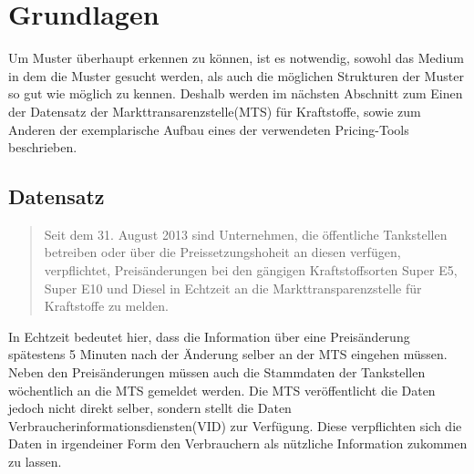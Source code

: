 \documentclass[12pt,a4paper,bibliography=totocnumbered,listof=totocnumbered]{scrartcl}
\begin{document}
\section{Grundlagen}
Um Muster überhaupt erkennen zu können, ist es notwendig, sowohl das Medium in dem die Muster gesucht werden, als auch die möglichen Strukturen der Muster so gut wie möglich zu kennen. Deshalb werden im nächsten Abschnitt zum Einen der Datensatz der Markttransarenzstelle(MTS) für Kraftstoffe, sowie zum Anderen der exemplarische Aufbau eines der verwendeten Pricing-Tools beschrieben.

\subsection{Datensatz}

\begin{quote} 
\glqq Seit dem 31. August 2013 sind Unternehmen, die öffentliche Tankstellen betreiben oder über die Preissetzungshoheit an diesen verfügen, verpflichtet, Preisänderungen bei den gängigen Kraftstoffsorten Super E5, Super E10 und Diesel in Echtzeit an die Markttransparenzstelle für Kraftstoffe zu melden.\grqq\cite{BkMTS}
\end{quote}

In Echtzeit bedeutet hier, dass die Information über eine Preisänderung spätestens 5 Minuten nach der Änderung selber an der MTS eingehen müssen. Neben den Preisänderungen müssen auch die Stammdaten der Tankstellen wöchentlich an die MTS gemeldet werden. Die MTS veröffentlicht die Daten jedoch nicht direkt selber, sondern stellt die Daten Verbraucherinformationsdiensten(VID) zur Verfügung. Diese verpflichten sich die Daten in irgendeiner Form den Verbrauchern als nützliche Information zukommen zu lassen. 
\end{document}

